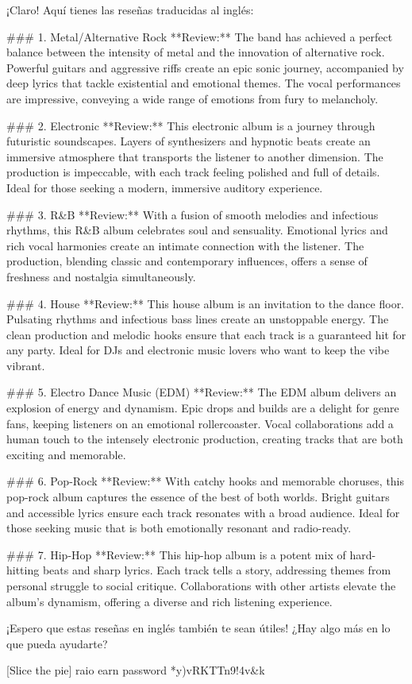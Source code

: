 ¡Claro! Aquí tienes las reseñas traducidas al inglés:

### 1. Metal/Alternative Rock
**Review:** The band has achieved a perfect balance between the intensity of metal and the innovation of alternative rock. 
Powerful guitars and aggressive riffs create an epic sonic journey,
 accompanied by deep lyrics that tackle existential and emotional themes. 
The vocal performances are impressive, conveying a wide range of emotions from fury to melancholy.

### 2. Electronic
**Review:** This electronic album is a journey through futuristic soundscapes. 
Layers of synthesizers and hypnotic beats create an immersive atmosphere that transports the listener to another dimension.
 The production is impeccable, with each track feeling polished and full of details. Ideal for those seeking a modern, 
 immersive auditory experience.

### 3. R&B
**Review:** With a fusion of smooth melodies and infectious rhythms, 
this R&B album celebrates soul and sensuality. 
Emotional lyrics and rich vocal harmonies create an intimate connection with the listener. 
The production, blending classic and contemporary influences, offers a sense of freshness and nostalgia simultaneously.

### 4. House
**Review:** This house album is an invitation to the dance floor. 
Pulsating rhythms and infectious bass lines create an unstoppable energy. 
The clean production and melodic hooks ensure that each track is a guaranteed hit for any party. 
Ideal for DJs and electronic music lovers who want to keep the vibe vibrant.

### 5. Electro Dance Music (EDM)
**Review:** The EDM album delivers an explosion of energy and dynamism. 
Epic drops and builds are a delight for genre fans, keeping listeners on an emotional rollercoaster.
 Vocal collaborations add a human touch to the intensely electronic production, 
 creating tracks that are both exciting and memorable.

### 6. Pop-Rock
**Review:** With catchy hooks and memorable choruses, 
this pop-rock album captures the essence of the best of both worlds.
 Bright guitars and accessible lyrics ensure each track resonates with a broad audience. 
 Ideal for those seeking music that is both emotionally resonant and radio-ready.

### 7. Hip-Hop
**Review:** This hip-hop album is a potent mix of hard-hitting beats and sharp lyrics. 
Each track tells a story, addressing themes from personal struggle to social critique. 
Collaborations with other artists elevate the album's dynamism, offering a diverse and rich listening experience.

¡Espero que estas reseñas en inglés también te sean útiles! ¿Hay algo más en lo que pueda ayudarte?

[Slice the pie] 
raio earn password{
    *y)vRKTTn9!4v&k
}
